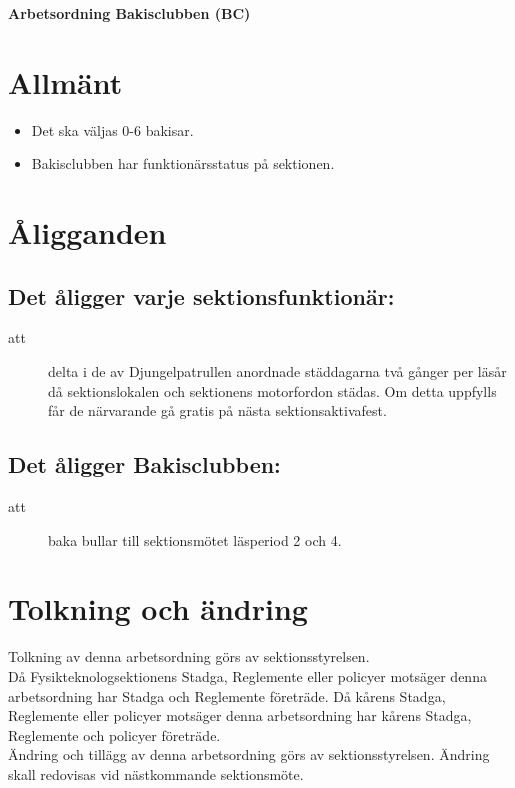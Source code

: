 \renewcommand{\dateseparator}{-} %

\renewcommand{\forening}{Bakisclubben}

\begin{center}
\LARGE{\textbf{Arbetsordning Bakisclubben (BC)}}
\end{center}


\section{Allmänt}
\begin{itemize}


\item Det ska väljas 0-6 bakisar.

\item Bakisclubben har funktionärsstatus på sektionen.


\end{itemize}


\section{Åligganden}
\subsection{Det åligger varje sektionsfunktionär:}
    \begin{description}
      \item[att] delta i de av Djungelpatrullen anordnade städdagarna två gånger per
      läsår då sektionslokalen och sektionens motorfordon städas. Om detta uppfylls får de närvarande gå gratis på nästa
      sektionsaktivafest.
    \end{description}
    
\subsection{Det åligger Bakisclubben:}
\begin{description}
      \item[att] baka bullar till sektionsmötet läsperiod 2 och 4. 
      
\end{description}

\section{Tolkning och ändring}
Tolkning av denna arbetsordning görs av sektionsstyrelsen.\\ Då Fysikteknologsektionens Stadga, Reglemente eller policyer motsäger denna arbetsordning har Stadga och Reglemente företräde. Då kårens Stadga, Reglemente eller policyer motsäger denna arbetsordning har kårens Stadga, Reglemente och policyer företräde.\\
Ändring och tillägg av denna arbetsordning görs av sektionsstyrelsen. Ändring skall redovisas vid nästkommande sektionsmöte. 

\newpage 
 